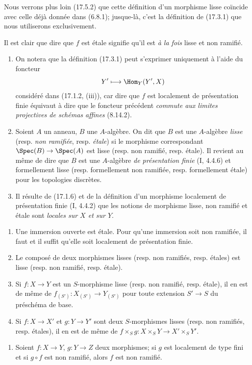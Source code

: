 Nous verrons plus loin (17.5.2) que cette définition d'un morphisme lisse coïncide avec celle déjà donnée dans (6.8.1); jusque-là, c'est la définition de (17.3.1) que nous utiliserons exclusivement.

Il est clair que dire que $f$ est étale signifie qu'il est \emph{à la fois} lisse et non ramifié.

\begin{remarks}[17.3.2]
\label{IV.17.3.2}
\begin{enumerate}
  \item[(i)] On notera que la définition (17.3.1) peut s'exprimer uniquement à l'aide du foncteur
  \[
    Y'\longmapsto\Hom_Y(Y',X)
  \]
  considéré dans (17.1.2, (iii)), car dire que $f$ est localement de présentation finie équivaut à dire que le foncteur précédent \emph{commute aux limites projectives de schémas affines} (8.14.2).
  \item[(ii)] Soient $A$ un anneau, $B$ une $A$-algèbre. On dit que $B$ est une $A$-algèbre \emph{lisse} (resp. \emph{non ramifiée}, resp. \emph{étale}) si le morphisme correspondant $\Spec(B)\to\Spec(A)$ est lisse (resp. non ramifié, resp. étale). Il revient au même de dire que $B$ est une $A$-algèbre \emph{de présentation finie} (I, 4.4.6) et formellement lisse (resp. formellement non ramifiée, resp. formellement étale) pour les topologies discrètes.
  \item[(iii)] Il résulte de (17.1.6) et de la définition d'un morphisme localement de présentation finie (I, 4.4.2) que les notions de morphisme lisse, non ramifié et étale sont \emph{locales sur $X$ et sur $Y$}.
\end{enumerate}
\end{remarks}

\begin{proposition}[17.3.3]
\label{IV.17.3.3}
\begin{enumerate}
  \item[(i)] Une immersion ouverte est étale. Pour qu'une immersion soit non ramifiée, il faut et il suffit qu'elle soit localement de présentation finie.
  \item[(ii)] Le composé de deux morphismes lisses (resp. non ramifiés, resp. étales) est lisse (resp. non ramifié, resp. étale).
  \item[(iii)] Si $f:X\to Y$ est un $S$-morphisme lisse (resp. non ramifié, resp. étale), il en est de même de $f_{(S')}:X_{(S')}\to Y_{(S')}$ pour toute extension $S'\to S$ du préschéma de base.
  \item[(iv)] Si $f:X\to X'$ et $g:Y\to Y'$ sont deux $S$-morphismes lisses (resp. non ramifiés, resp. étales), il en est de même de $f\times_S g:X\times_S Y\to X'\times_S Y'$.
\end{enumerate}


\begin{enumerate}
  \item[(v)] Soient $f:X\to Y$, $g:Y\to Z$ deux morphismes; si $g$ est localement de type fini et si $g\circ f$ est non ramifié, alors $f$ est non ramifié.
\end{enumerate}
\end{proposition}

